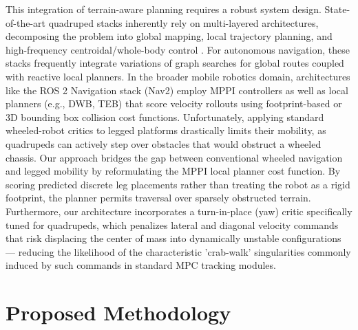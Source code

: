 \documentclass[letterpaper, 10 pt, conference]{ieeeconf}  %
\begin{document}
This integration of terrain-aware planning requires a robust system design. State-of-the-art quadruped stacks inherently rely on multi-layered architectures, decomposing the problem into global mapping, local trajectory planning, and high-frequency centroidal/whole-body control \cite{Hutter2016ANYmal,
Bledt2018MITCheetah3}. For autonomous navigation, these stacks frequently integrate variations of graph searches for global routes coupled with reactive local planners. In the broader mobile robotics domain, architectures like the ROS 2 Navigation stack (Nav2) employ MPPI controllers as well as local planners (e.g., DWB, TEB) that score velocity rollouts using footprint-based or 3D bounding box collision cost functions. Unfortunately, applying standard wheeled-robot critics to legged platforms drastically limits their mobility, as quadrupeds can actively step over obstacles that would obstruct a wheeled chassis. Our approach bridges the gap between conventional wheeled navigation and legged mobility by reformulating the MPPI local planner cost function. By scoring predicted discrete leg placements rather than treating the robot as a rigid footprint, the planner permits traversal over sparsely obstructed terrain. Furthermore, our architecture incorporates a turn-in-place (yaw) critic specifically tuned for quadrupeds, which penalizes lateral and diagonal velocity commands that risk displacing the center of mass into dynamically unstable configurations — reducing the likelihood of the characteristic 'crab-walk' singularities commonly induced by such commands in standard MPC tracking modules.

\section{Proposed Methodology}
\label{sec:methodology}
\end{document}
